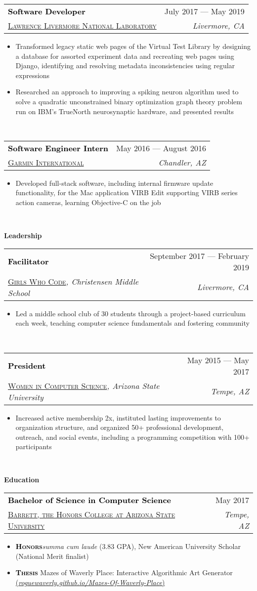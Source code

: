 \documentclass[letterpaper,11pt]{article}
\makeatletter
\newcommand{\boldsc}[1]{\textcolor{black}{\textbf{\textsc{#1}}}}
\newcommand{\resumeSpacing}{5pt}
\newcommand{\resumeSection}[1]{
  \begin{flushleft}
  {\LARGE
  \textcolor{accent}{\textbf{#1}}
  \hrulefill}
  \end{flushleft}
}
\newcommand{\resumeSubsection}[6]{
  \begin{center}
  \vspace{-2.5pt}
	\begin{tabular*}{\textwidth}{l@{\extracolsep{\fill}}r}
	\large\textcolor{black}{\textbf{#1}} & \small\textcolor{accent}{#2} \\
  \href{#4}{\textsc{#3}}\textit{#6} & \textit{#5} \\
	\end{tabular*}
  \vspace{-\resumeSpacing}
  \end{center}
}
\newenvironment{resumeItemize}{
  \addtolength{\leftmargini}{-\resumeSpacing}
  \begin{minipage}{0.99\textwidth}
  \begin{itemize}
  \small
}{
  \end{itemize}
  \vspace{0pt}
  \end{minipage}
  \normalsize
  \ \\
}
\newcommand{\resumeItem}[1]
{
  \raggedright
  \item{#1}
  \vspace{-\resumeSpacing}
}
\makeatother
\begin{document}
  \resumeSubsection
  {Software Developer}{July 2017 --- May 2019}
  {Lawrence Livermore National Laboratory}{https://www.llnl.gov/}{Livermore, CA}{}
  \begin{resumeItemize}
    \resumeItem
    {Transformed legacy static web pages of the Virtual Test Library by designing a database for assorted experiment data and recreating web pages using Django, identifying and resolving metadata inconsistencies using regular expressions}
    \resumeItem
    {Researched an approach to improving a spiking neuron algorithm used to solve a quadratic unconstrained binary optimization graph theory problem run on IBM's TrueNorth neurosynaptic hardware, and presented results}
  \end{resumeItemize}
	\resumeSubsection
  {Software Engineer Intern}{May 2016 --- August 2016}
  {Garmin International}{https://www.garmin.com/}{Chandler, AZ}{}
	\begin{resumeItemize}
    \resumeItem
    {Developed full-stack software, including internal firmware update functionality, for the Mac application VIRB Edit supporting VIRB series action cameras, learning Objective-C on the job}
	\end{resumeItemize}
  \resumeSection{Leadership}
  \resumeSubsection
  {Facilitator}{September 2017 --- February 2019}
  {Girls Who Code}{https://girlswhocode.com/}{Livermore, CA}{, Christensen Middle School}
  \begin{resumeItemize}
    \resumeItem
    {Led a middle school club of 30 students through a project-based curriculum each week, teaching computer science fundamentals and fostering community}
  \end{resumeItemize}
  \resumeSubsection
  {President}{May 2015 --- May 2017}
  {Women in Computer Science}{http://wics-asu.org/}{Tempe, AZ}{, Arizona State University}
  \begin{resumeItemize}
    \resumeItem
    {Increased active membership 2x, instituted lasting improvements to organization structure, and organized 50+ professional development, outreach, and social events, including a programming competition with 100+ participants}
  \end{resumeItemize}
  \resumeSection{Education}
  \resumeSubsection
  {Bachelor of Science in Computer Science}{May 2017}
  {Barrett, the Honors College at Arizona State University}{https://barretthonors.asu.edu/}{Tempe, AZ}{}
  \begin{resumeItemize}
	  \resumeItem
    {\boldsc{Honors}\space\textit{summa cum laude} (3.83 GPA), New American University Scholar (National Merit finalist)}
	  \resumeItem
    {\boldsc{Thesis} Mazes of Waverly Place: Interactive Algorithmic Art Generator \href{https://roguewaverly.github.io/Mazes-Of-Waverly-Place/}{(\textit{roguewaverly.github.io/Mazes-Of-Waverly-Place})}}
  \end{resumeItemize}
  \vspace{-\resumeSpacing}
\end{document}
